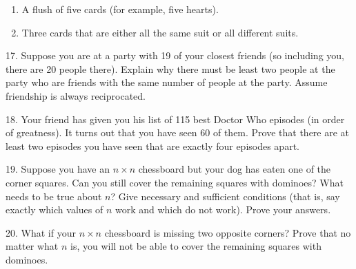 \documentclass[10pt,]{book}
\theoremstyle{plain}
\theoremstyle{definition}
\numberwithin{equation}{chapter}
\begin{document}
\begin{exerciselist}
\begin{enumerate}[label=(\alph*)]
\item\hypertarget{li-701}{}
              A flush of five cards (for example, five hearts).


\item\hypertarget{li-702}{}
              Three cards that are either all the same suit or all different suits.


\end{enumerate}
\par\smallskip
\item[17.]\hypertarget{exercise-258}{}
          Suppose you are at a party with 19 of your closest friends (so including you, there are 20 people there). Explain why there must be least two people at the party who are friends with the same number of people at the party. Assume friendship is always reciprocated.
\par\smallskip
\item[18.]\hypertarget{exercise-259}{}
          Your friend has given you his list of 115 best Doctor Who episodes (in order of greatness).  It turns out that you have seen 60 of them.  Prove that there are at least two episodes you have seen that are exactly four episodes apart.
\par\smallskip
\item[19.]\hypertarget{exercise-260}{}
          Suppose you have an \(n\times n\) chessboard but your dog has eaten one of the corner squares. Can you still cover the remaining squares with dominoes? What needs to be true about \(n\)? Give necessary and sufficient conditions (that is, say exactly which values of \(n\) work and which do not work). Prove your answers.
\leavevmode%
\begin{figure}
\centering
{
}
\end{figure}
\par\smallskip
\item[20.]\hypertarget{exercise-261}{}
          What if your \(n\times n\) chessboard is missing two opposite corners? Prove that no matter what \(n\) is, you will not be able to cover the remaining squares with dominoes.

\end{exerciselist}
\end{document}
